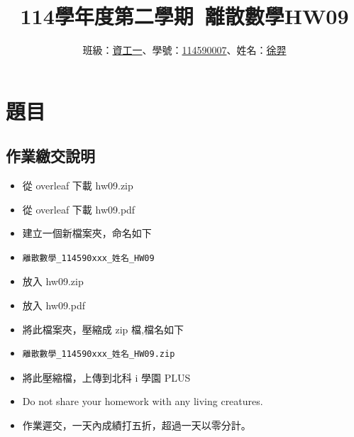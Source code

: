 \documentclass[sigconf]{acmart}
\begin{document}
\title{114學年度第二學期~離散數學HW09}

\author{班級：\underline{資工一}、學號：\underline{114590007}、姓名：\underline{徐羿}}
\orcid{}
\affiliation{%
  \institution{}
  \city{}
  \country{}
}

\renewcommand\footnotetextcopyrightpermission[1]{} %
\pagestyle{plain} %

\maketitle


\section{題目}
\subsection{作業繳交說明}
\begin{shaded}
\begin{itemize}
    \item[-] 從 overleaf 下載 hw09.zip
    \item[-] 從 overleaf 下載 hw09.pdf
    \item[-] 建立一個新檔案夾，命名如下
    \item[-] \color{red}\begin{verbatim}離散數學_114590xxx_姓名_HW09\end{verbatim}
    \item[-] \color{black}放入 hw09.zip
    \item[-] 放入 hw09.pdf
    \item[-] 將此檔案夾，壓縮成 zip 檔,檔名如下
    \item[-] \color{red}\begin{verbatim}離散數學_114590xxx_姓名_HW09.zip\end{verbatim}
    \item[-] \color{black}將此壓縮檔，上傳到北科 i 學園 PLUS
    \item[-] Do not share your homework with any living creatures.
    \item[-] 作業遲交，一天內成績打五折，超過一天以零分計。
\end{itemize}
\end{shaded}
\end{document}

